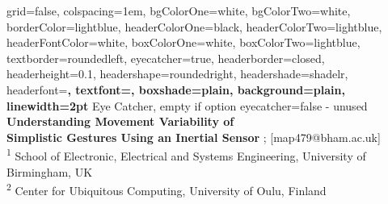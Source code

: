 \documentclass[a0paper,portrait]{baposter}
\begin{document}
\begin{poster}%
  {
  grid=false,
  colspacing=1em,
  bgColorOne=white,
  bgColorTwo=white,
  borderColor=lightblue,
  headerColorOne=black,
  headerColorTwo=lightblue,
  headerFontColor=white,
  boxColorOne=white,
  boxColorTwo=lightblue,
  textborder=roundedleft,
  eyecatcher=true,
  headerborder=closed,
  headerheight=0.1\textheight,
  headershape=roundedright,
  headershade=shadelr,
  headerfont=\Large\bf\textsc, %
  textfont={\setlength{\parindent}{1.5em}},
  boxshade=plain,
  background=plain,
  linewidth=2pt
  }
{
	Eye Catcher, empty if option eyecatcher=false - unused
}
{\bf
  {Understanding Movement Variability of \\ Simplistic Gestures Using an Inertial Sensor}
}
{
	{; [map479@bham.ac.uk]  } \\ 
	{\smaller
	\textsuperscript{1} School of Electronic, Electrical and Systems Engineering, University of Birmingham, UK \\
	\textsuperscript{2} Center for Ubiquitous Computing, University of Oulu, Finland }
}
  {%
  	}
\end{poster}
\end{document}
